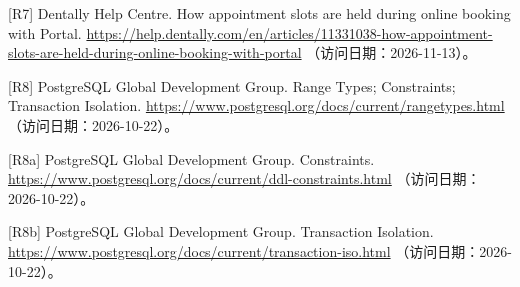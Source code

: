 \documentclass[UTF8,12pt,a4paper,fontset=none]{ctexart}
\begin{document}
\par\noindent\begin{minipage}{\linewidth}\raggedright [R7] Dentally Help Centre. How appointment slots are held during online booking with Portal. \url{https://help.dentally.com/en/articles/11331038-how-appointment-slots-are-held-during-online-booking-with-portal}\allowbreak{} （访问日期：2026-11-13）。\end{minipage}\par
\par\noindent\begin{minipage}{\linewidth}\raggedright [R8] PostgreSQL Global Development Group. Range Types; Constraints; Transaction Isolation. \url{https://www.postgresql.org/docs/current/rangetypes.html}\allowbreak{} （访问日期：2026-10-22）。\end{minipage}\par
\par\noindent\begin{minipage}{\linewidth}\raggedright [R8a] PostgreSQL Global Development Group. Constraints. \url{https://www.postgresql.org/docs/current/ddl-constraints.html}\allowbreak{} （访问日期：2026-10-22）。\end{minipage}\par
\par\noindent\begin{minipage}{\linewidth}\raggedright [R8b] PostgreSQL Global Development Group. Transaction Isolation. \url{https://www.postgresql.org/docs/current/transaction-iso.html}\allowbreak{} （访问日期：2026-10-22）。\end{minipage}\par
\end{document}
